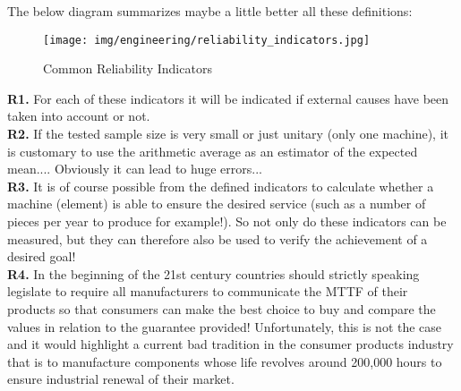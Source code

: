 	The below diagram summarizes maybe a little better all these definitions:
	\begin{figure}[H]
		\centering
		\texttt{[image: img/engineering/reliability\_indicators.jpg]}
		\caption{Common Reliability Indicators}
	\end{figure}
	\begin{tcolorbox}[title=Remarks,colframe=black,arc=10pt]
	\textbf{R1.} For each of these indicators it will be indicated if external causes have been taken into account or not.\\
	
	\textbf{R2.} If the tested sample size is very small or just unitary (only one machine), it is customary to use the arithmetic average as an estimator of the expected mean.... Obviously it can lead to huge errors...\\
	
	\textbf{R3.} It is of course possible from the defined indicators to calculate whether a machine (element) is able to ensure the desired service (such as a number of pieces per year to produce for example!). So not only do these indicators can be measured, but they can therefore also be used to verify the achievement of a desired goal!\\
	
	\textbf{R4.} In the beginning of the 21st century countries should strictly speaking legislate to require all manufacturers to communicate the MTTF of their products so that consumers can make the best choice to buy and compare the values in relation to the guarantee provided! Unfortunately, this is not the case and it would highlight a current bad tradition in the consumer products industry that is to manufacture components whose life revolves around 200,000 hours to ensure industrial renewal of their market.
	\end{tcolorbox}
	
